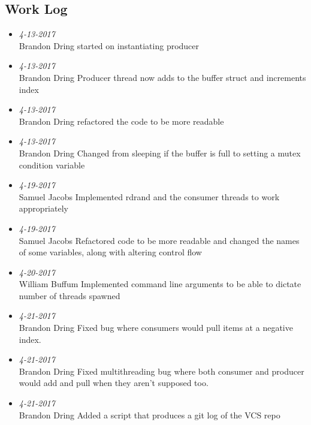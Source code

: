 \documentclass{article}
\begin{document}
\subsection*{Work Log }
\begin{itemize}
  \item \textit{4-13-2017}\\ Brandon Dring started on instantiating producer \\
  \item \textit{4-13-2017} \\ Brandon Dring Producer thread now adds to the buffer struct and increments index \\ 
  \item \textit{4-13-2017}\\ Brandon Dring refactored the code to be more readable \\
  \item \textit{4-13-2017}\\ Brandon Dring Changed from sleeping if the buffer is full to setting a mutex condition variable \\
  \item \textit{4-19-2017}\\  Samuel Jacobs Implemented rdrand and the consumer threads to work appropriately\\
  \item \textit{4-19-2017}\\ Samuel Jacobs Refactored code to be more readable and changed the names of some variables, along with altering control flow \\
  \item \textit{4-20-2017}\\ William Buffum Implemented command line arguments to be able to dictate number of threads spawned \\ 
  \item \textit{4-21-2017}\\ Brandon Dring Fixed bug where consumers would pull items at a negative index. 
  \item \textit{4-21-2017} \\ Brandon Dring Fixed multithreading bug where both consumer and producer would add and pull when they aren't supposed too.
  \item \textit{4-21-2017} \\ Brandon Dring Added a script that produces a git log of the VCS repo
\end{itemize}
\end{document}
